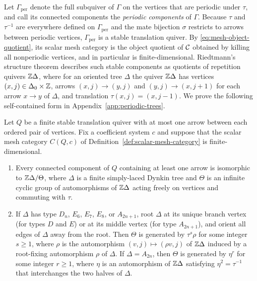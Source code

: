 Let $\Gamma_{\mathrm{per}}$ denote the full subquiver of $\Gamma$ on the
vertices that are periodic under $\tau$, and call its connected components
the \emph{periodic components} of $\Gamma$. Because $\tau$ and $\tau^{-1}$
are everywhere defined on $\Gamma_{\mathrm{per}}$ and the mate bijection
$\sigma$ restricts to arrows between periodic vertices, $\Gamma_{\mathrm{per}}$
is a stable translation quiver. By \eqref{eq:mesh-object-quotient}, its
scalar mesh category is the object quotient of $\mathcal C$ obtained by killing all
nonperiodic vertices, and in particular is finite-dimensional. Riedtmann's
structure theorem \cite[Sections~1.5--1.6 and~2.1]{Riedtmann1980} describes
such stable components as quotients of repetition quivers $\mathbb Z\Delta$, where
for an oriented tree $\Delta$ the quiver $\mathbb Z\Delta$ has vertices
$(x,j)\in\Delta_0\times\mathbb Z$, arrows $(x,j)\to(y,j)$ and $(y,j)\to(x,j+1)$ for
each arrow $x\to y$ of $\Delta$, and translation $\tau(x,j)=(x,j-1)$. We
prove the following self-contained form in Appendix~\ref{app:periodic-trees}.

\begin{proposition}
\label{prop:periodic-tree-model}
Let $Q$ be a finite stable translation quiver with at most one arrow between
each ordered pair of vertices. Fix a coefficient system $c$ and suppose that
the scalar mesh category $C(Q,c)$ of Definition~\ref{def:scalar-mesh-category}
is finite-dimensional.
\begin{enumerate}[label={\upshape(\arabic*)}]
\item Every connected component of $Q$ containing at least one arrow is
isomorphic to $\mathbb Z\Delta/\Theta$, where $\Delta$ is a finite simply-laced
Dynkin tree and $\Theta$ is an infinite cyclic group of automorphisms of
$\mathbb Z\Delta$ acting freely on vertices and commuting with $\tau$.
\item If $\Delta$ has type $D_n$, $E_6$, $E_7$, $E_8$, or $A_{2n+1}$, root
$\Delta$ at its unique branch vertex (for types $D$ and $E$) or at its middle
vertex (for type $A_{2n+1}$), and orient all edges of $\Delta$ away from the
root. Then $\Theta$ is generated by $\tau^s\rho$ for some integer $s\geq1$,
where $\rho$ is the automorphism $(v,j)\mapsto(\rho v,j)$ of $\mathbb Z\Delta$
induced by a root-fixing automorphism $\rho$ of $\Delta$. If $\Delta=A_{2n}$,
then $\Theta$ is generated by $\eta^r$ for some integer $r\geq1$, where
$\eta$ is an automorphism of $\mathbb Z\Delta$ satisfying $\eta^2=\tau^{-1}$ that
interchanges the two halves of $\Delta$.
\end{enumerate}
\end{proposition}

